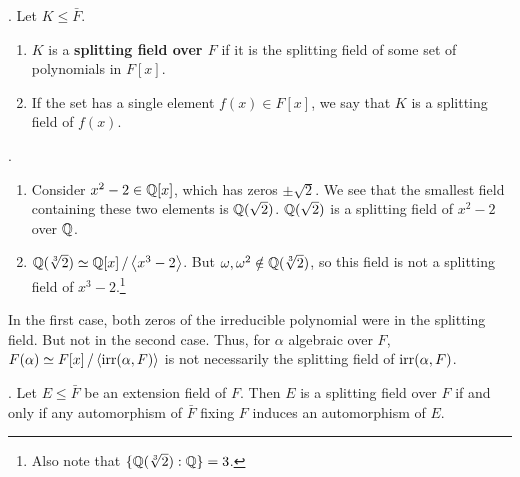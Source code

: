 . Let \(K \leq \bar{F}\).
\begin{enumerate}
    \item \(K\) is a \textbf{splitting field over \(F\)} if it is the splitting field of some set of polynomials in \(F[x]\).
    \item If the set has a single element \(f(x) \in F[x]\), we say that \(K\) is a splitting field of \(f(x)\).
\end{enumerate}

\ex.
\begin{enumerate}
    \item Consider \(x^2 -2 \in \mathbb{Q}[x]\), which has zeros \(\pm \sqrt{2}\). We see that the smallest field containing these two elements is \(\mathbb{Q}(\sqrt{2})\). \(\mathbb{Q}(\sqrt{2})\) is a splitting field of \(x^2 - 2\) over \(\mathbb{Q}\).

    \item \(\mathbb{Q}(\sqrt[3]{2}) \simeq \mathbb{Q}[x] \operatorname{/} \left\langle x^3 - 2 \right\rangle\). But \(\omega, \omega^2 \notin \mathbb{Q}(\sqrt[3]{2})\), so this field is not a splitting field of \(x^3 - 2\).\footnote{Also note that \(\{\mathbb{Q}(\sqrt[3]{2}) : \mathbb{Q}\} = 3\).}
\end{enumerate}

In the first case, both zeros of the irreducible polynomial were in the splitting field. But not in the second case. Thus, for \(\alpha\) algebraic over \(F\), \(F(\alpha) \simeq F[x] \operatorname{/} \left\langle \mathrm{irr}(\alpha, F) \right\rangle\) is not necessarily the splitting field of \(\mathrm{irr}(\alpha, F)\).

\thm. Let \(E \leq \bar{F}\) be an extension field of \(F\). Then \(E\) is a splitting field over \(F\) if and only if any automorphism of \(\bar{F}\) fixing \(F\) induces an automorphism of \(E\).

